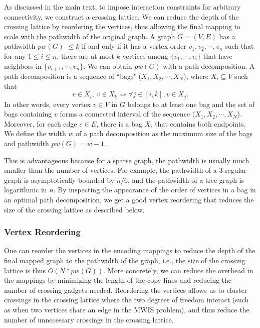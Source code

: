 As discussed in the main text, to impose interaction constraints for arbitrary connectivity, we construct a crossing lattice.  We can reduce the depth of the crossing lattice by reordering the vertices, thus allowing the final mapping to scale with the pathwidth of the original graph. A graph $G = (V, E)$ has a pathwidth $pw(G)$ $\le k$ if and only if it has a vertex order $v_1, v_2, \cdots, v_n$ such that for any $1 \le i \le n$, there are at most $k$ vertices among $\{ v_1, \cdots, v_i \}$ that have neighbors in $\{ v_{i + 1}, \cdots, v_n \}$.  We can obtain $pw(G)$ with a path decomposition.  A path decomposition is a sequence of ``bags" ($X_1, X_2, \cdots, X_N$), where $X_i \subseteq V$ such that 
\begin{equation}
    v \in X_i, \ v \in X_k \Longrightarrow \forall j \in [i, k], v \in X_j.
\end{equation}
In other words, every vertex $v \in V$ in $G$ belongs to at least one bag and the set of bags containing $v$ forms a connected interval of the sequence $(X_1, X_2, \cdots, X_N$).  Moreover, for each edge $e \in E$, there is a bag $X_i$ that contains both endpoints. We define the width $w$ of a path decomposition as the maximum size of the bags and pathwidth $pw(G) = w - 1$.

This is advantageous because for a sparse graph, the pathwidth is usually much smaller than the number of vertices.  For example, the pathwidth of a 3-regular graph is asymptotically bounded by $n/6$, and the pathwidth of a tree graph is logarithmic in $n$.  By inspecting the appearance of the order of vertices in a bag in an optimal path decomposition, we get a good vertex reordering that reduces the size of the crossing lattice as described below.

\subsubsection{Vertex Reordering}
One can reorder the vertices in the encoding mappings to reduce the depth of the final mapped graph to the pathwidth of the graph, i.e., the size of the crossing lattice is thus $O(N*pw(G))$. More concretely, we can reduce the overhead in the mappings by minimizing the length of the copy lines and reducing the number of crossing gadgets needed. Reordering the vertices allows us to cluster crossings in the crossing lattice where the two degrees of freedom interact (such as when two vertices share an edge in the MWIS problem), and thus reduce the number of unnecessary crossings in the crossing lattice.

